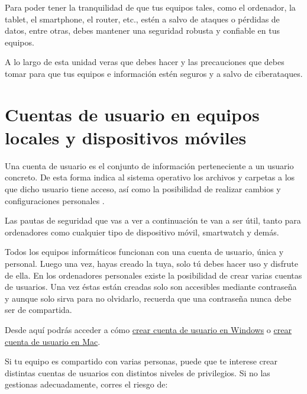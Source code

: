 \documentclass[
  a4paper,
  openany]{book}
\begin{document}
Para poder tener la tranquilidad de que tus equipos tales, como el ordenador, la tablet, el smartphone, el router, etc., estén a salvo de ataques o pérdidas de datos, entre otras, debes mantener una seguridad robusta y confiable en tus equipos.

A lo largo de esta unidad veras que debes hacer y las precauciones que debes tomar para que tus equipos e información estén seguros y a salvo de ciberataques.

\hypertarget{cuentas-de-usuario-en-equipos-locales-y-dispositivos-muxf3viles}{%
\section{Cuentas de usuario en equipos locales y dispositivos móviles}\label{cuentas-de-usuario-en-equipos-locales-y-dispositivos-muxf3viles}}

Una cuenta de usuario es el conjunto de información perteneciente a un usuario concreto. De esta forma indica al sistema operativo los archivos y carpetas a los que dicho usuario tiene acceso, así como la posibilidad de realizar cambios y configuraciones personales \citep{OSI-cuentas}.

Las pautas de seguridad que vas a ver a continuación te van a ser útil, tanto para ordenadores como cualquier tipo de dispositivo móvil, smartwatch y demás.

Todos los equipos informáticos funcionan con una cuenta de usuario, única y personal. Luego una vez, hayas creado la tuya, solo tú debes hacer uso y disfrute de ella. En los ordenadores personales existe la posibilidad de crear varias cuentas de usuarios. Una vez éstas están creadas solo son accesibles mediante contraseña y aunque solo sirva para no olvidarlo, recuerda que una contraseña nunca debe ser de compartida.

Desde aquí podrás acceder a cómo \href{https://support.microsoft.com/es-es/windows/crear-una-cuenta-de-administrador-o-de-usuario-local-en-windows-10-20de74e0-ac7f-3502-a866-32915af2a34d}{crear cuenta de usuario en Windows} o \href{https://support.apple.com/es-es/guide/mac-help/mtusr001/mac\#:~:text=A\%C3\%B1adir\%20un\%20usuario,en\%20\%E2\%80\%9CUsuarios\%20y\%20grupos\%E2\%80\%9D.\&text=Si\%20el\%20candado\%20situado\%20en,bajo\%20la\%20lista\%20de\%20usuarios}{crear cuenta de usuario en Mac}.

Si tu equipo es compartido con varias personas, puede que te interese crear distintas cuentas de usuarios con distintos niveles de privilegios. Si no las gestionas
adecuadamente, corres el riesgo de:
\end{document}
